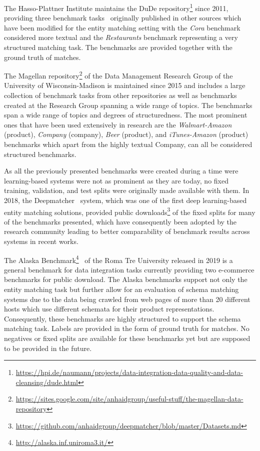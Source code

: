\documentclass[sigconf,edbt]{acmart-edbt2024}
\begin{document}
The Hasso-Plattner Institute maintains the DuDe repository\footnote{\url{https://hpi.de/naumann/projects/data-integration-data-quality-and-data-cleansing/dude.html}} since 2011, providing three benchmark tasks~\cite{draisbachDuDeDuplicateDetection2017} originally published in other sources which have been modified for the entity matching setting with the \textit{Cora} benchmark considered more textual and the \textit{Restaurants} benchmark representing a very structured matching task. The benchmarks are provided together with the ground truth of matches.

The Magellan repository\footnote{\url{https://sites.google.com/site/anhaidgroup/useful-stuff/the-magellan-data-repository}} of the Data Management Research Group of the University of Wisconsin-Madison is maintained since 2015 and includes a large collection of benchmark tasks from other repositories as well as benchmarks created at the Research Group spanning a wide range of topics. The benchmarks span a wide range of topics and degrees of structuredness. The most prominent ones that have been used extensively in research are the \textit{Walmart-Amazon} (product), \textit{Company} (company), \textit{Beer} (product), and \textit{iTunes-Amazon} (product) benchmarks which apart from the highly textual Company, can all be considered structured benchmarks.

As all the previously presented benchmarks were created during a time were learning-based systems were not as prominent as they are today, no fixed training, validation, and test splits were originally made available with them. In 2018, the Deepmatcher~\cite{mudgalDeepLearningEntity2018} system, which was one of the first deep learning-based entity matching solutions, provided public downloads\footnote{\url{https://github.com/anhaidgroup/deepmatcher/blob/master/Datasets.md}} of the fixed splits for many of the benchmarks presented, which have consequently been adopted by the research community leading to better comparability of benchmark results across systems in recent works. 

The Alaska Benchmark\footnote{\url{http://alaska.inf.uniroma3.it/}}~\cite{crescenziAlaskaFlexibleBenchmark2021} of the Roma Tre University released in 2019 is a general benchmark for data integration tasks currently providing two e-commerce benchmarks for public download. The Alaska benchmarks support not only the entity matching task but further allow for an evaluation of schema matching systems due to the data being crawled from web pages of more than 20 different hosts which use different schemata for their product representations. Consequently, these benchmarks are highly structured to support the schema matching task. Labels are provided in the form of ground truth for matches. No negatives or fixed splits are available for these benchmarks yet but are supposed to be provided in the future.
\end{document}
